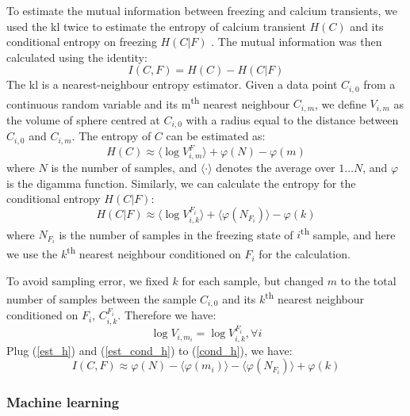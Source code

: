 To estimate the mutual information between freezing and calcium transients, we used the \gls{kl} twice to estimate the entropy of calcium transient $H(C)$ and its conditional entropy on freezing $H(C|F)$ \citep{victor02, ross14}. The mutual information was then calculated using the identity:
\begin{equation} \label{cond_h}
    I(C, F) = H(C) - H(C|F)
\end{equation}
The \gls{kl} is a nearest-neighbour entropy estimator. Given a data point $C_{i,0}$ from a continuous random variable and its m\textsuperscript{th} nearest neighbour $C_{i,m}$, we define $V_{i,m}$ as the volume of sphere centred at $C_{i,0}$ with a radius equal to the distance between $C_{i,0}$ and $C_{i,m}$. The entropy of $C$ can be estimated as:
\begin{equation} \label{est_h}
    H(C) \approx \langle \log V_{i,m}^F\rangle + \varphi(N) - \varphi(m)
\end{equation}
where $N$ is the number of samples, and $\langle\cdot\rangle$ denotes the average over $1\ldots N$, and $\varphi$ is the digamma function. Similarly, we can calculate the entropy for the conditional entropy $H(C|F)$:
\begin{equation} \label{est_cond_h}
    H(C|F) \approx \langle \log V_{i,k}^{F_i} \rangle + \langle \varphi(N_{F_i}) \rangle - \varphi(k)
\end{equation}
where $N_{F_i}$ is the number of samples in the freezing state of $i$\textsuperscript{th} sample, and here we use the $k$\textsuperscript{th} nearest neighbour conditioned on $F_i$ for the calculation.

To avoid sampling error, we fixed $k$ for each sample, but changed $m$ to the total number of samples between the sample $C_{i,0}$ and its $k$\textsuperscript{th} nearest neighbour conditioned on $F_i$, $C_{i,k}^{F_i}$. Therefore we have:
\begin{equation*}
\log V_{i, m_i} = \log V_{i, k}^{F_i}, \forall i 
\end{equation*}
Plug (\ref{est_h}) and (\ref{est_cond_h}) to (\ref{cond_h}), we have:
\begin{equation*}
    I(C, F) \approx \varphi(N) - \langle\varphi(m_i)\rangle - \langle\varphi(N_{F_i})\rangle + \varphi(k)
\end{equation*}




\subsubsection{Machine learning}

